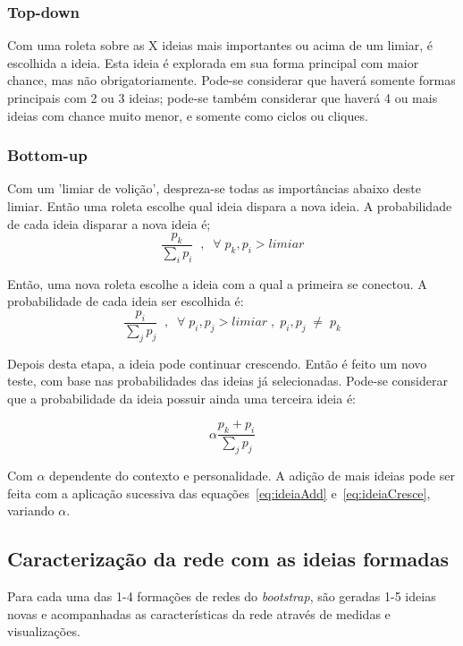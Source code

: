 \documentclass[a4paper,12pt,titlepage]{article}
\begin{document}
\subsubsection{Top-down}
Com uma roleta sobre as X ideias mais importantes ou acima de um limiar, é escolhida a ideia. Esta ideia é explorada em sua forma principal com maior chance, mas não obrigatoriamente. Pode-se considerar que haverá somente formas principais com 2 ou 3 ideias; pode-se também considerar que haverá 4 ou mais ideias com chance muito menor, e somente como ciclos ou cliques.

\subsubsection{Bottom-up}
Com um 'limiar de volição', despreza-se todas as importâncias abaixo deste limiar. Então
uma roleta escolhe qual ideia dispara a nova ideia. A probabilidade
de cada ideia disparar a nova ideia é;
\begin{equation}
\frac{p_k}{\sum_ip_i}\;\;,\;\; \forall \;p_k,p_i > limiar
\end{equation}

Então, uma nova roleta escolhe a ideia com a qual a primeira
se conectou. A probabilidade de cada ideia ser escolhida é:
\begin{equation}\label{eq:ideiaAdd}
\frac{p_i}{\sum_jp_j}\;\;,\;\; \forall \;p_i,p_j > limiar\;,\; p_i,p_j \;\neq\; p_k
\end{equation}

Depois desta etapa, a ideia pode continuar crescendo. Então é feito um novo teste, com base nas
probabilidades das ideias já selecionadas. Pode-se considerar que a probabilidade
da ideia possuir ainda uma terceira ideia é:

\begin{equation}\label{eq:ideiaCresce}
\alpha\frac{p_k+p_i}{\sum_jp_j}
\end{equation}

Com $\alpha$ dependente do contexto e personalidade. A adição de mais ideias
pode ser feita com a aplicação sucessiva das equações~\ref{eq:ideiaAdd} e~\ref{eq:ideiaCresce},
variando $\alpha$.

\subsection{Caracterização da rede com as ideias formadas}
Para cada uma das 1-4 formações de redes do \emph{bootstrap}, são geradas
1-5 ideias novas e acompanhadas as características da rede através de medidas e visualizações.
\end{document}
